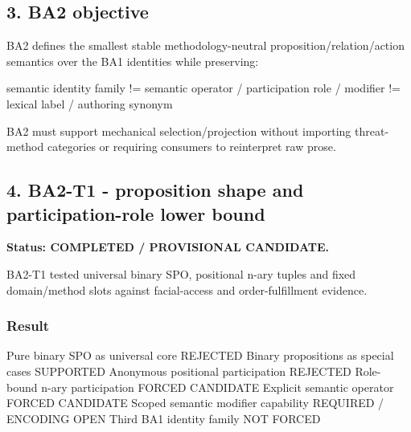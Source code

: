 \documentclass[
  10pt,
  letterpaper,
]{article}
\newenvironment{Shaded}{}{}
\newcommand{\NormalTok}[1]{#1}
\begin{document}
\subsection{3. BA2 objective}\label{ba2-objective}

BA2 defines the smallest stable methodology-neutral
proposition/relation/action semantics over the BA1 identities while
preserving:

\begin{Shaded}
\begin{Highlighting}[]
\NormalTok{semantic identity family}
\NormalTok{    !=}
\NormalTok{semantic operator / participation role / modifier}
\NormalTok{    !=}
\NormalTok{lexical label / authoring synonym}
\end{Highlighting}
\end{Shaded}

BA2 must support mechanical selection/projection without importing
threat-method categories or requiring consumers to reinterpret raw
prose.

\subsection{4. BA2-T1 - proposition shape and participation-role lower
bound}\label{ba2-t1---proposition-shape-and-participation-role-lower-bound}

\textbf{Status: COMPLETED / PROVISIONAL CANDIDATE.}

BA2-T1 tested universal binary SPO, positional n-ary tuples and fixed
domain/method slots against facial-access and order-fulfillment
evidence.

\subsubsection{Result}\label{result}

\begin{Shaded}
\begin{Highlighting}[]
\NormalTok{Pure binary SPO as universal core       REJECTED}
\NormalTok{Binary propositions as special cases   SUPPORTED}
\NormalTok{Anonymous positional participation      REJECTED}
\NormalTok{Role{-}bound n{-}ary participation          FORCED CANDIDATE}
\NormalTok{Explicit semantic operator              FORCED CANDIDATE}
\NormalTok{Scoped semantic modifier capability     REQUIRED / ENCODING OPEN}
\NormalTok{Third BA1 identity family               NOT FORCED}
\end{Highlighting}
\end{Shaded}
\end{document}
